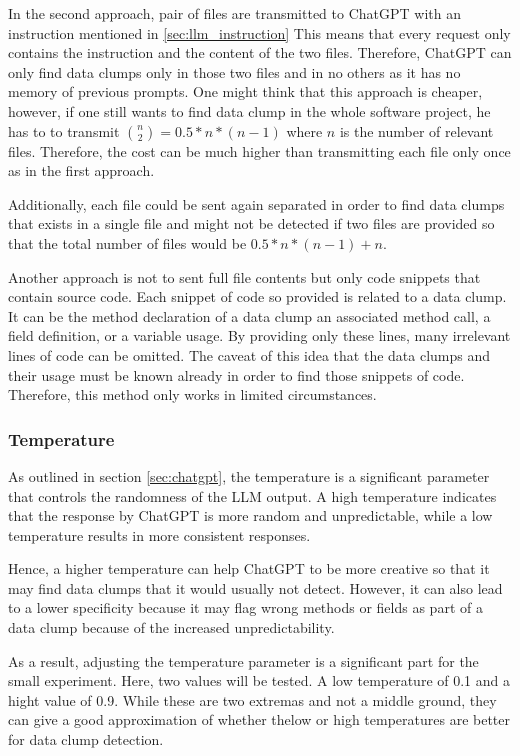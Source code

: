In the second approach, pair of files are transmitted to ChatGPT with an instruction mentioned in \ref{sec:llm_instruction}
This means that every request only contains the instruction and the content of the two files. Therefore, ChatGPT can only find data clumps only in those two files and in no others as it has no memory of previous prompts. One might think that this approach is cheaper, however, if one still wants to find data clump in the whole software project, he has to to transmit $\binom{n}{2}=0.5*n*(n-1)$ where $n$ is the number of relevant files. Therefore, the cost can be much higher than transmitting each file only once as in the first approach.

Additionally, each file could be sent again separated in order to find data clumps that exists in a single file and might not be detected if two files are provided so that the total number of files would be $0.5*n*(n-1)+n$.


Another approach is not to sent full file contents but only code snippets that contain source code. Each snippet of code so provided is related to a data clump. It can be the method declaration of a data clump an associated method call, a field definition, or a variable usage. By providing only these lines, many irrelevant lines of code can be omitted. The caveat of this idea that the data clumps  and their usage must be known already in order to find those snippets of code. Therefore, this method only works in limited circumstances.

\subsubsection{Temperature}
As outlined in section \ref{sec:chatgpt}, the temperature is a significant parameter that controls the randomness of the \ac{LLM} output. A high temperature indicates that the response by ChatGPT is more random and unpredictable, while a low temperature results in more consistent responses.

Hence, a higher temperature can help ChatGPT to be more creative so that it may find data clumps that it would usually not detect. However, it can also lead to a lower specificity because it may flag wrong methods or fields as part of a data clump because of the increased unpredictability. 

As a result, adjusting the temperature parameter is a significant part for the small experiment. Here, two values will be tested. A low temperature of 0.1 and a hight value of 0.9. While these are two extremas and not a middle ground, they can give a good approximation of whether thelow or high temperatures are better for data clump detection. 

